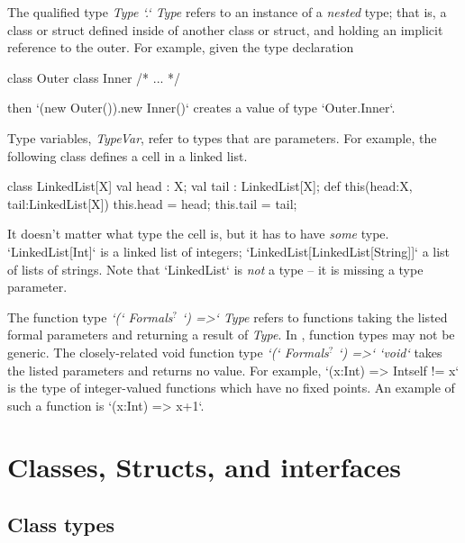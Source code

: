 The qualified type {\em Type \xcd`.` Type} refers to an instance of a {\em
nested} type; that is, a class or struct defined inside of another class or
struct, and holding an implicit reference to the outer.  For example, given
the type declaration 
\begin{xten}
class Outer {
  class Inner { /* ... */ }
}
\end{xten}
%
then 
\xcd`(new Outer()).new Inner()` creates a value of type 
\xcd`Outer.Inner`.

Type variables, {\em TypeVar}, refer to types that are parameters.  For
example, the following class defines a cell in a linked list.  
\begin{xten}
class LinkedList[X] {
  val head : X;
  val tail : LinkedList[X];
  def this(head:X, tail:LinkedList[X]) {
     this.head = head; this.tail = tail;
  }
}
\end{xten}
%
It doesn't
matter what type the cell is, but it has to have {\em some} type.
\xcd`LinkedList[Int]` is a linked list of integers;
\xcd`LinkedList[LinkedList[String]]` a list of lists of strings.
Note that \xcd`LinkedList` is {\em not} a type -- it is missing a type parameter.



The function type 
{\em \xcd`(` Formals{$^?$} \xcd`) =>`  Type} 
refers to functions taking the
listed formal parameters and returning a result of {\em Type}.  In
\XtenCurrVer, function types may not be generic.
The closely-related void function type 
{\em \xcd`(` Formals{$^?$} \xcd`) =>`  \xcd`void`}  takes the listed
parameters and returns no value.
For example, 
\xcd`(x:Int) => Int{self != x}` 
is the type of integer-valued functions which have no fixed points.  
An example of such a function is \xcd`(x:Int) => x+1`.





\section{Classes, Structs,  and interfaces}
\label{ReferenceTypes}

\subsection{Class types}

